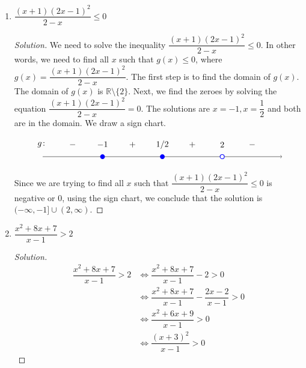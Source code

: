 \documentclass[12pt]{article}
\newenvironment{solution}{\begin{proof}[Solution]}{\end{proof}}
\begin{document}
\begin{enumerate}
\begin{enumerate}
\begin{solution}
				Since we are trying to find all $x$ such that $(x+1)(2x-1)^2(2-x)$ is negative, using the sign chart, we conclude that the solution is $(-\infty,-1)\cup (2,\infty)$.
				\end{solution}

			\item $\dfrac{(x+1)(2x-1)^2}{2-x}\leq 0$
			
				\begin{solution}
				We need to solve the inequality $\dfrac{(x+1)(2x-1)^2}{2-x}\leq 0$. In other words, we need to find all $x$ such that $g(x) \leq 0$, where $g(x)=\dfrac{(x+1)(2x-1)^2}{2-x}$. The first step is to find the domain of $g(x)$. The domain of $g(x)$ is $\mathbb{R}\setminus \{2\}$. Next, we find the zeroes by solving the equation $\dfrac{(x+1)(2x-1)^2}{2-x}=0$. The solutions are $x=-1,x=\dfrac{1}{2}$ and both are in the domain.
				We draw a sign chart. 
				
				\[
				\begin{tikzpicture}[scale=1]
					\draw[->] (-7,0) -- (3,0);
					
					\draw (-2,0) node[circle,blue,fill,inner sep=2pt]{};
					\draw (-4.5,0) node[circle,blue,fill,inner sep=2pt]{};
					\draw[blue, thick, fill=white] (0.5,0) circle (2.5pt);
					
					\node at (-2, .5) {1/2};
					\node at (-4.5, .5) {$-1$};
					\node at (0.5, .5) {2};
					\node at (-7,.5) {$g\colon$};
					\node at (-3.25,.5) {$+$};
					\node at (-0.75,.5) {$+$};
					\node at (1.75, .5) {$-$};
					\node at (-5.75, .5) {$-$};
				\end{tikzpicture}
				\]		
				
				Since we are trying to find all $x$ such that $\dfrac{(x+1)(2x-1)^2}{2-x}\leq 0$ is negative or 0, using the sign chart, we conclude that the solution is $(-\infty,-1]\cup (2,\infty)$.
			\end{solution}
			\item $\dfrac{x^2+8x+7}{x-1}>2$
			\begin{solution}
				\begin{align*}
					\dfrac{x^2+8x+7}{x-1}>2 &\iff \dfrac{x^2+8x+7}{x-1}-2>0\\
					&\iff \dfrac{x^2+8x+7}{x-1}-\dfrac{2x-2}{x-1}>0\\
					&\iff \dfrac{x^2+6x+9}{x-1}>0\\
					&\iff \dfrac{(x+3)^2}{x-1}>0					
				\end{align*}
				

\end{solution}
\end{enumerate}
\end{enumerate}
\end{document}

